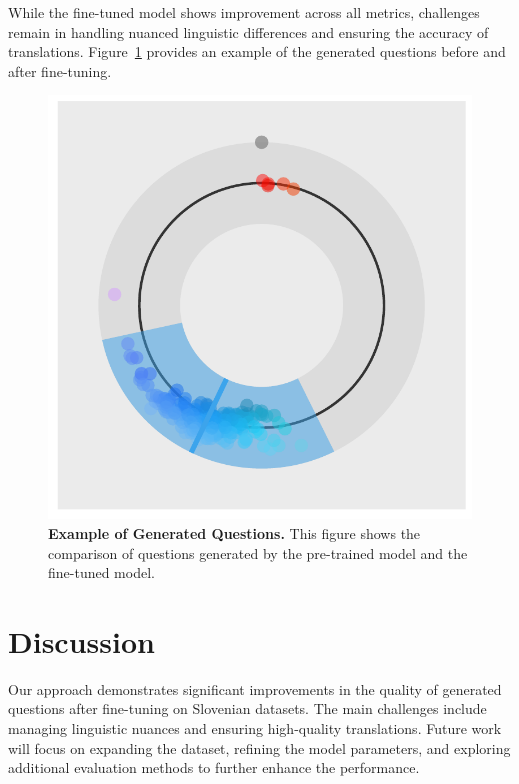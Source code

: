 \documentclass[fleqn,moreauthors,10pt]{ds_report}
\begin{document}
While the fine-tuned model shows improvement across all metrics, challenges remain in handling nuanced linguistic differences and ensuring the accuracy of translations. Figure~\ref{fig:example} provides an example of the generated questions before and after fine-tuning.

\begin{figure}[ht]\centering
    \includegraphics[width=\linewidth]{fig/single_column.pdf}
    \caption{\textbf{Example of Generated Questions.} This figure shows the comparison of questions generated by the pre-trained model and the fine-tuned model.}
    \label{fig:example}
\end{figure}


\section*{Discussion}
Our approach demonstrates significant improvements in the quality of generated questions after fine-tuning on Slovenian datasets. The main challenges include managing linguistic nuances and ensuring high-quality translations. Future work will focus on expanding the dataset, refining the model parameters, and exploring additional evaluation methods to further enhance the performance.
\end{document}
